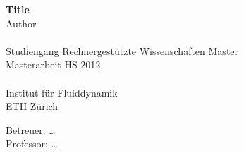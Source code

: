 \begin{titlepage}
\begin{center}
    \vspace*{1cm}
    {\huge \bfseries Title\\}
    \vspace{2cm}
    {\large 
        Author\\
	~\\
	Studiengang Rechnergestützte Wissenschaften Master\\
	\vspace{3.5cm}
	Masterarbeit HS 2012\\
	~\\
	Institut für Fluiddynamik\\
	ETH Zürich\\
    }




{\large
	Betreuer: \ldots\\[\baselineskip]
	Professor: \ldots
}
\end{center}

\vspace*{2cm}

\end{titlepage}
